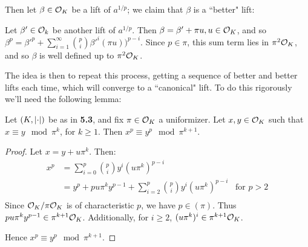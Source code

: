 \documentclass[10pt,a4paper]{article}
\begin{document}
Then let $\beta \in \mathcal{O}_K$ be a lift of $a^{1/p}$; we claim that $\beta$ is a ``better" lift:

Let $\beta' \in \mathcal{O}_k$ be another lift of $a^{1/p}$. Then $\beta = \beta' + \pi u, u \in \mathcal{O}_K$, and so $\beta^p = \beta'^p + \sum_{i=1}^\infty \binom{p}{i} \beta'^i(\pi u))^{p-i}$. Since $p \in \pi$, this sum term lies in $\pi^2 \mathcal{O}_K$, and so $\beta$ is well defined up to $\pi^2 \mathcal{O}_K$.

The idea is then to repeat this process, getting a sequence of better and better lifts each time, which will converge to a ``canonical" lift. To do this rigorously we'll need the following lemma:

\begin{lemma}
  Let $(K, \lvert\cdot\rvert)$ be as in \textbf{5.3}, and fix $\pi \in\mathcal{O}_K$ a uniformizer. Let $x, y \in \mathcal{O}_K$ such that $x \equiv y \mod \pi^k$, for $k \geq 1$. Then $x^p \equiv y^p \mod \pi^{k+1}$.
\end{lemma}
\begin{proof}
  Let $x = y+u\pi^k$. Then:
  \begin{align*}
    x^p &= \sum_{i=0}^p \binom{p}{i} y^i (u\pi^k)^{p-i}\\
    &= y^p + pu\pi^k y^{p-1} + \sum_{i=2}^p\binom{p}{i}y^i(u\pi^k)^{p-i}\;\;\;\text{for $p>2$}\\
  \end{align*}
  Since $\mathcal{O}_K/\pi\mathcal{O}_K$ is of characteristic $p$, we have $p \in (\pi)$. Thus $pu\pi^ky^{p-1} \in \pi^{k+1}\mathcal{O}_K$. Additionally, for $i \geq 2$, $(u\pi^k)^i \in \pi^{k+1}\mathcal{O}_K$.

  Hence $x^p \equiv y^p \mod \pi^{k+1}$.
\end{proof}
\end{document}
